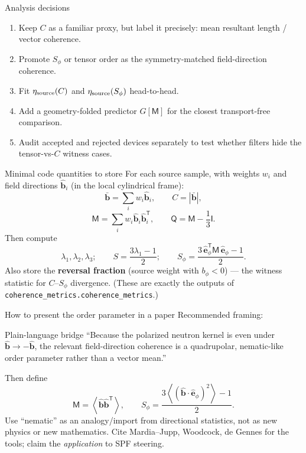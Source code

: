 \documentclass[aspectratio=169]{beamer}
\newcommand{\bb}{\hat{\bm b}}
\newcommand{\I}{\mathsf I}
\newcommand{\T}{\mathsf T}
\newcommand{\avg}[1]{\left\langle #1 \right\rangle}
\newcommand{\M}{\mathsf M}
\newcommand{\Qten}{\mathsf Q}
\newcommand{\ephi}{\hat{\bm e}_\phi}
\newcommand{\Sphi}{S_\phi}
\begin{document}
\begin{frame}[t]{Analysis decisions}
\begin{enumerate}
  \item Keep $C$ as a familiar proxy, but label it precisely: mean resultant length / vector coherence.
  \item Promote $\Sphi$ or tensor order as the symmetry-matched field-direction coherence.
  \item Fit $\eta_{\rm source}(C)$ and $\eta_{\rm source}(\Sphi)$ head-to-head.
  \item Add a geometry-folded predictor $G[\M]$ for the closest transport-free comparison.
  \item Audit accepted and rejected devices separately to test whether filters hide the tensor-vs-$C$ witness cases.
\end{enumerate}
\end{frame}

\begin{frame}[t]{Minimal code quantities to store}
For each source sample, with weights $w_i$ and field directions $\bb_i$ (in the local cylindrical frame):
\[
\bar{\bm b}=\sum_i w_i\bb_i,
\qquad
C=|\bar{\bm b}|,
\]
\[
\M=\sum_i w_i\bb_i\bb_i^\T,
\qquad
\Qten=\M-\frac{1}{3}\I.
\]
Then compute
\[
\lambda_1,\lambda_2,\lambda_3;
\qquad
S=\frac{3\lambda_1-1}{2};
\qquad
\Sphi=\frac{3\,\ephi^\T\M\,\ephi-1}{2}.
\]
Also store the \textbf{reversal fraction} (source weight with $b_\phi<0$) --- the witness statistic for $C$--$\Sphi$ divergence. (These are exactly the outputs of \texttt{coherence\_metrics.coherence\_metrics}.)
\end{frame}

\begin{frame}[t]{How to present the order parameter in a paper}
Recommended framing:
\begin{block}{Plain-language bridge}
``Because the polarized neutron kernel is even under $\bb\rightarrow-\bb$, the relevant field-direction coherence is a quadrupolar, nematic-like order parameter rather than a vector mean.''
\end{block}
Then define
\[
\M=\avg{\bb\bb^\T},
\qquad
\Sphi=\frac{3\avg{(\bb\cdot\ephi)^2}-1}{2}.
\]
Use ``nematic'' as an analogy/import from directional statistics, not as new physics or new mathematics. Cite Mardia--Jupp, Woodcock, de Gennes for the tools; claim the \emph{application} to SPF steering.
\end{frame}
\end{document}
